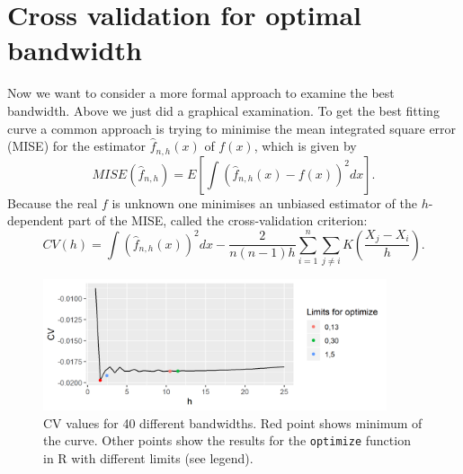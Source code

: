 \section{Cross validation for optimal bandwidth}  
Now we want to consider a more formal approach to examine the best bandwidth. Above we just did a graphical examination. To get the best fitting curve a common approach is trying to minimise the mean integrated square error (MISE) for the estimator $\hat{f}_{n,h}(x)$ of $f(x)$, which is given by $$MISE(\hat{f}_{n,h})=E\left[\int\left(\hat{f}_{n,h}(x)-f(x)\right)^2dx\right].$$ Because the real $f$ is unknown one minimises an unbiased estimator of the $h$-dependent part of the MISE, called the cross-validation criterion: $$CV(h)=\int\left(\hat{f}_{n,h}(x)\right)^2dx-\frac{2}{n(n-1)h}\sum_{i=1}^{n} \sum_{j\neq i} K\left(\frac{X_j - X_i}{h}\right).$$
\begin{figure}[!tb]
\centering
\includegraphics[width=0.9\textwidth, keepaspectratio]{ex8/CV1.png}
\caption{CV values for 40 different bandwidths. Red point shows minimum of the curve. Other points show the results for the \texttt{optimize} function in R with different limits (see legend).}
\label{6CV1}
\end{figure} 

